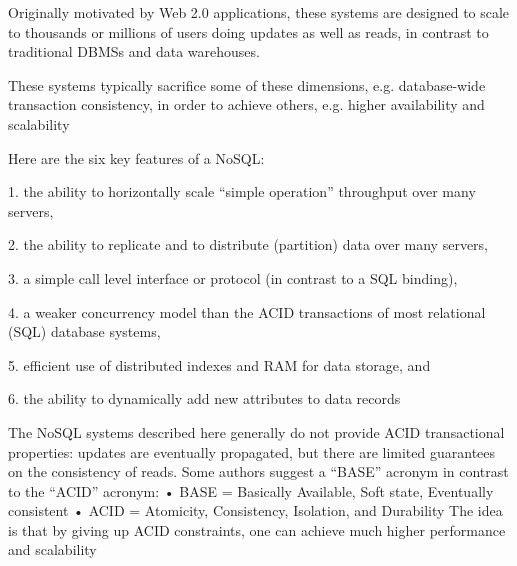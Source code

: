 Originally motivated by Web 2.0 applications, these
systems are designed to scale to thousands or millions
of users doing updates as well as reads, in contrast to
traditional DBMSs and data warehouses.

These systems typically sacrifice some of
these dimensions, e.g. database-wide transaction
consistency, in order to achieve others, e.g. higher
availability and scalability

Here are the six key features of a \textsf{NoSQL}:

1. the ability to horizontally scale “simple
operation” throughput over many servers,

2. the ability to replicate and to distribute (partition)
data over many servers,

3. a simple call level interface or protocol (in
contrast to a SQL binding),

4. a weaker concurrency model than the ACID
transactions of most relational (SQL) database
systems,

5. efficient use of distributed indexes and RAM for
data storage, and

6. the ability to dynamically add new attributes to
data records

The NoSQL systems described here generally do not
provide ACID transactional properties: updates are
eventually propagated, but there are limited guarantees
on the consistency of reads. Some authors suggest a
“BASE” acronym in contrast to the “ACID” acronym:
• BASE = Basically Available, Soft state,
Eventually consistent
• ACID = Atomicity, Consistency, Isolation, and
Durability
The idea is that by giving up ACID constraints, one
can achieve much higher performance and scalability
